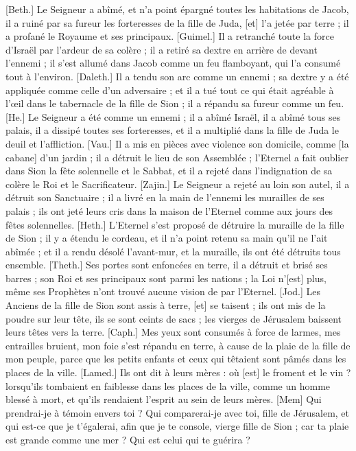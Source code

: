 \begin{multicols}{2}
[Beth.] Le Seigneur a abîmé, et n’a point épargné toutes les habitations de Jacob, il a ruiné par sa fureur les forteresses de la fille de Juda, [et] l’a jetée par terre ; il a profané le Royaume et ses principaux.
[Guimel.] Il a retranché toute la force d’Israël par l’ardeur de sa colère ; il a retiré sa dextre en arrière de devant l’ennemi ; il s’est allumé dans Jacob comme un feu flamboyant, qui l’a consumé tout à l’environ.
[Daleth.] Il a tendu son arc comme un ennemi ; sa dextre y a été appliquée comme celle d’un adversaire ; et il a tué tout ce qui était agréable à l’œil dans le tabernacle de la fille de Sion ; il a répandu sa fureur comme un feu.
[He.] Le Seigneur a été comme un ennemi ; il a abîmé Israël, il a abîmé tous ses palais, il a dissipé toutes ses forteresses, et il a multiplié dans la fille de Juda le deuil et l’affliction.
[Vau.] Il a mis en pièces avec violence son domicile, comme [la cabane] d’un jardin ; il a détruit le lieu de son Assemblée ; l’Eternel a fait oublier dans Sion la fête solennelle et le Sabbat, et il a rejeté dans l’indignation de sa colère le Roi et le Sacrificateur.
[Zajin.] Le Seigneur a rejeté au loin son autel, il a détruit son Sanctuaire ; il a livré en la main de l’ennemi les murailles de ses palais ; ils ont jeté leurs cris dans la maison de l’Eternel comme aux jours des fêtes solennelles.
[Heth.] L’Eternel s’est proposé de détruire la muraille de la fille de Sion ; il y a étendu le cordeau, et il n’a point retenu sa main qu’il ne l’ait abîmée ; et il a rendu désolé l’avant-mur, et la muraille, ils ont été détruits tous ensemble.
[Theth.] Ses portes sont enfoncées en terre, il a détruit et brisé ses barres ; son Roi et ses principaux sont parmi les nations ; la Loi n’[est] plus, même ses Prophètes n’ont trouvé aucune vision de par l’Eternel.
[Jod.] Les Anciens de la fille de Sion sont assis à terre, [et] se taisent ; ils ont mis de la poudre sur leur tête, ils se sont ceints de sacs ; les vierges de Jérusalem baissent leurs têtes vers la terre.
[Caph.] Mes yeux sont consumés à force de larmes, mes entrailles bruient, mon foie s’est répandu en terre, à cause de la plaie de la fille de mon peuple, parce que les petits enfants et ceux qui têtaient sont pâmés dans les places de la ville.
[Lamed.] Ils ont dit à leurs mères : où [est] le froment et le vin ? lorsqu’ils tombaient en faiblesse dans les places de la ville, comme un homme blessé à mort, et qu’ils rendaient l’esprit au sein de leurs mères.
[Mem] Qui prendrai-je à témoin envers toi ? Qui comparerai-je avec toi, fille de Jérusalem, et qui est-ce que je t’égalerai, afin que je te console, vierge fille de Sion ; car ta plaie est grande comme une mer ? Qui est celui qui te guérira ?

\end{multicols}
